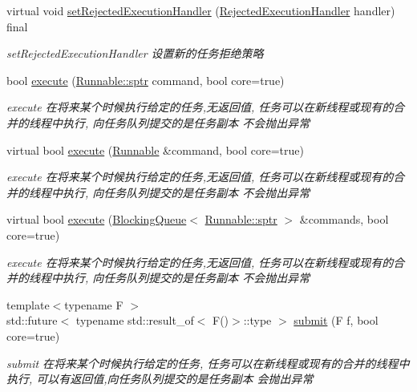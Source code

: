 \begin{DoxyCompactItemize}
virtual void \hyperlink{classThreadPoolExecutor_a0a471dc0a68b70d99d8215565a4df688}{set\+Rejected\+Execution\+Handler} (\hyperlink{classRejectedExecutionHandler}{Rejected\+Execution\+Handler} handler) final
\begin{DoxyCompactList}\small\item\em set\+Rejected\+Execution\+Handler 设置新的任务拒绝策略 \end{DoxyCompactList}\item 
bool \hyperlink{classThreadPoolExecutor_a4dac3c2435919af5d77aa36069d35bc7}{execute} (\hyperlink{classRunnable_abe8d3066c7305401d6f0aad8e70780f2}{Runnable\+::sptr} command, bool core=true)
\begin{DoxyCompactList}\small\item\em execute 在将来某个时候执行给定的任务,无返回值, 任务可以在新线程或现有的合并的线程中执行, 向任务队列提交的是任务副本 不会抛出异常 \end{DoxyCompactList}\item 
virtual bool \hyperlink{classThreadPoolExecutor_a523df0545790ef03a82623b05e3b20f9}{execute} (\hyperlink{classRunnable}{Runnable} \&command, bool core=true)
\begin{DoxyCompactList}\small\item\em execute 在将来某个时候执行给定的任务,无返回值, 任务可以在新线程或现有的合并的线程中执行, 向任务队列提交的是任务副本 不会抛出异常 \end{DoxyCompactList}\item 
virtual bool \hyperlink{classThreadPoolExecutor_a451bba3f90dbed2ba7e491ebc391b3c6}{execute} (\hyperlink{classBlockingQueue}{Blocking\+Queue}$<$ \hyperlink{classRunnable_abe8d3066c7305401d6f0aad8e70780f2}{Runnable\+::sptr} $>$ \&commands, bool core=true)
\begin{DoxyCompactList}\small\item\em execute 在将来某个时候执行给定的任务,无返回值, 任务可以在新线程或现有的合并的线程中执行, 向任务队列提交的是任务副本 不会抛出异常 \end{DoxyCompactList}\item 
{\footnotesize template$<$typename F $>$ }\\std\+::future$<$ typename std\+::result\+\_\+of$<$ F()$>$\+::type $>$ \hyperlink{classThreadPoolExecutor_a94834ab6bedcc75111524fec4e928b3f}{submit} (F f, bool core=true)
\begin{DoxyCompactList}\small\item\em submit 在将来某个时候执行给定的任务, 任务可以在新线程或现有的合并的线程中执行, 可以有返回值,向任务队列提交的是任务副本 会抛出异常 \end{DoxyCompactList}\item 

\end{DoxyCompactItemize}
